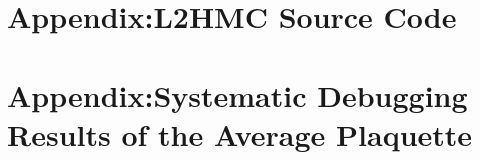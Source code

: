 \documentclass[10pt,notitlepage]{report}
\begin{document}
\begin{appendix}
%
\chapter{Appendix:\@ L2HMC Source Code}%
\label{chap:l2hmc_source_code}

% 
\chapter{Appendix:\@ Systematic Debugging Results of the Average Plaquette}%
\label{chap:debugging_results}
% 

%
\end{appendix}

\clearpage
\printbibliography[title={References}, heading=bibintoc]
\end{document}
